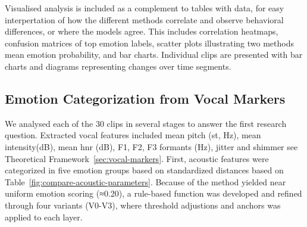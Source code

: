 Visualised analysis is included as a complement to tables with data, for easy interpertation of how the different methods correlate and observe behavioral differences, or where the models agree. 
This includes correlation heatmaps, confusion matrices of top emotion labels, scatter plots illustrating two methods mean emotion probability, and bar charts. 
Individual clips are presented with bar charts and diagrams representing changes over time segments. 



\subsection{Emotion Categorization from Vocal Markers}
\label{sec:method-data-an-voc}
We analysed each of the 30 clips in several stages to answer the first research question. Extracted vocal features included mean pitch (st, Hz), mean intensity(dB), mean hnr (dB), F1, F2, F3 formants (Hz), jitter and shimmer see Theoretical Framework~\ref{sec:vocal-markers}.
First, acoustic features were categorized in five emotion groups based on standardized distances based on Table~\ref{fig:compare-acoustic-parameters}. Because of the method yielded near uniform emotion scoring (≈0.20), a rule-based function was developed and refined through four variants (V0-V3), 
where threshold adjustions and anchors was applied to each layer. 

